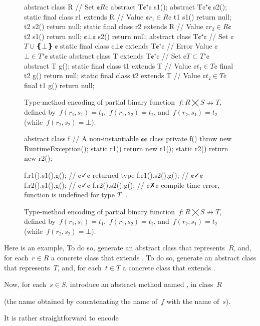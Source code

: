 \begin{figure}
  \begin{JAVA}[style=numbered]
abstract class R { // Set ¢$R$¢
  abstract T¢$⁺$¢ s1();
  abstract T¢$⁺$¢ s2();
  static final class r1 extends R { // Value ¢$r₁∈R$¢
    t1 s1() { return null; }
    t2 s2() { return null; }
  }
  static final class r2 extends R { // Value ¢$r₂∈R$¢
    t2 s1() { return null; }
    ¢$⊥$¢ s2() { return null; }
  }
}
abstract class T¢$⁺$¢ { // Set ¢$T∪❴⊥❵~$¢
  static final class ¢$⊥$¢ extends T¢$⁺$¢ {} // Error Value ¢$⊥∈T⁺$¢
  static abstract class T extends T¢$⁺$¢ { // Set ¢$T⊂T⁺$¢
    abstract T g(); 
  } 
  static final class t1 extends T { // Value ¢$t₁∈T$¢
    final t2 g() { return null; }
  } 
  static final class t2 extends T { // Value ¢$t₂∈T$¢
    final t1 g() { return null; }
  } 
}
\end{JAVA}
  \caption{Type-method encoding of partial binary function~$f: R⨉S↛T$,
  defined by~$f(r₁,s₁)=t₁$,~$f(r₁,s₂)=t₂$, and~$f(r₂,s₁)=t₂$ (while~$f(r₂, s₂) =⊥$).}
\end{figure}

\begin{figure}
  \begin{JAVA}
abstract class f { // A non-instantiable ¢¢ class
  private f() { throw new RuntimeException(); }
  static r1() { return new r1(); }
  static r2() { return new r2(); }
}
\end{JAVA}
  \begin{JAVA}
f.r1().s1().g(); // ¢✓¢ returned type 
f.r1().s2().g(); // ¢✓¢
f.r2().s1().g(); // ¢✓¢
f.r2().s2().g(); // ¢✗¢ compile time error, function  is undefined for type $T^+$.
\end{JAVA}
  \caption{Type-method encoding of partial binary function~$f: R⨉S↛T$,
  defined by~$f(r₁,s₁)=t₁$,~$f(r₁,s₂)=t₂$, and~$f(r₂,s₁)=t₂$ (while~$f(r₂, s₂) =⊥$).}
\end{figure}
\cmark\xmark

Here is an example,
To do so, generate an abstract class  that represents~$R$, and,
  for each~$r∈R$ a concrete class  that extends .
To do so, generate an abstract class  that represents~$T$, and,
  for each~$t∈T$ a concrete class  that extends .

Now, for each~$s∈S$, introduce an abstract method named ,
  in class~$R$

(the name obtained by
  concatenating the name of~$f$ with the name of~$s$).

It is rather straightforward to encode

